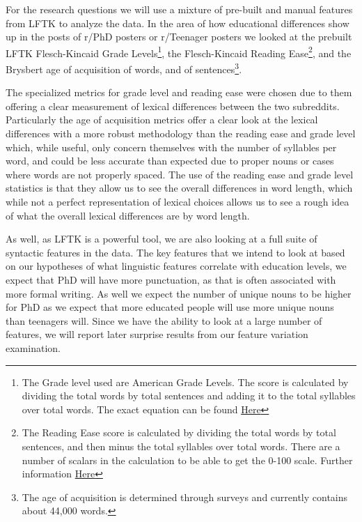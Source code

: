\documentclass[11pt]{article}
\begin{document}
For the research questions we will use a mixture of pre-built and manual features from LFTK to analyze the data. In the area of how educational differences show up in the posts of r/PhD posters or r/Teenager posters we looked at the prebuilt LFTK Flesch-Kincaid Grade Levels\footnote{The Grade level used are American Grade Levels. The score is calculated by dividing the total words by total sentences and adding it to the total syllables over total words. The exact equation can be found \hyperlink{https://web.archive.org/web/20201210212716/https://apps.dtic.mil/sti/pdfs/ADA006655.pdf}{Here} }, the Flesch-Kincaid Reading Ease\footnote{The Reading Ease score is calculated by dividing the total words by total sentences, and then minus the total syllables over total words. There are a number of scalars in the calculation to be able to get the 0-100 scale. Further information \hyperlink{https://web.archive.org/web/20160712094308/http://www.mang.canterbury.ac.nz/writing_guide/writing/flesch.shtml}{Here} }, and the Brysbert age of acquisition of words, and of sentences\footnote{The age of acquisition is determined through surveys and currently contains about 44,000 words.}.



The specialized metrics for grade level and reading ease were chosen due to them offering a clear measurement of lexical differences between the two subreddits. Particularly the age of acquisition metrics offer a clear look at the lexical differences with a more robust methodology than the reading ease and grade level which, while useful, only concern themselves with the number of syllables per word, and could be less accurate than expected due to proper nouns or cases where words are not properly spaced. The use of the reading ease and grade level statistics is that they allow us to see the overall differences in word length, which while not a perfect representation of lexical choices allows us to see a rough idea of what the overall lexical differences are by word length. 

As well, as LFTK is a powerful tool, we are also looking at a full suite of syntactic features in the data. The key features that we intend to look at based on our hypotheses of what linguistic features correlate with education levels, we expect that PhD will have more punctuation, as that is often associated with more formal writing. As well we expect the number of unique nouns to be higher for PhD as we expect that more educated people will use more unique nouns than teenagers will. Since we have the ability to look at a large number of features, we will report later surprise results from our feature variation examination. 
\end{document}
